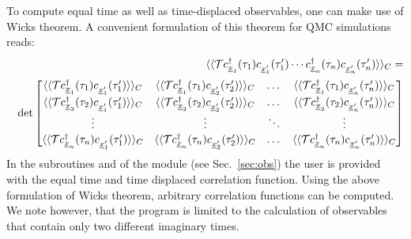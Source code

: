 To compute equal time as well as time-displaced observables,  one can make use of Wicks theorem. A convenient formulation of this theorem for  QMC simulations reads: 
\begin{eqnarray}
& & \langle \langle 	{\cal T}   c^{\dagger}_{\underline x_{1}}(\tau_{1}) c^{\phantom\dagger}_{{\underline x}'_{1}}(\tau'_{1})  
\cdots c^{\dagger}_{\underline x_{n}}(\tau_{n}) c^{\phantom\dagger}_{{\underline x}'_{n}}(\tau'_{n}) 
\rangle \rangle_{C} =
\nonumber \\ & & \det  
\begin{bmatrix}
   \langle \langle   {\cal T}   c^{\dagger}_{\underline x_{1}}(\tau_{1}) c^{\phantom\dagger}_{{\underline x}'_{1}}(\tau'_{1})  \rangle \rangle_{C} & 
    \langle \langle  {\cal T}   c^{\dagger}_{\underline x_{1}}(\tau_{1}) c^{\phantom\dagger}_{{\underline x}'_{2}}(\tau'_{2})  \rangle \rangle_{C}  & \dots   &   
    \langle \langle   {\cal T}   c^{\dagger}_{\underline x_{1}}(\tau_{1}) c^{\phantom\dagger}_{{\underline x}'_{n}}(\tau'_{n})  \rangle \rangle_{C}  \\
    \langle \langle   {\cal T}   c^{\dagger}_{\underline x_{2}}(\tau_{2}) c^{\phantom\dagger}_{{\underline x}'_{1}}(\tau'_{1})  \rangle \rangle_{C}  & 
      \langle \langle   {\cal T}   c^{\dagger}_{\underline x_{2}}(\tau_{2}) c^{\phantom\dagger}_{{\underline x}'_{2}}(\tau'_{2})  \rangle \rangle_{C}  & \dots  &
       \langle \langle   {\cal T}   c^{\dagger}_{\underline x_{2}}(\tau_{2}) c^{\phantom\dagger}_{{\underline x}'_{n}}(\tau'_{n})  \rangle \rangle_{C}   \\
    \vdots & \vdots &  \ddots & \vdots \\
    \langle \langle   {\cal T}   c^{\dagger}_{\underline x_{n}}(\tau_{n}) c^{\phantom\dagger}_{{\underline x}'_{1}}(\tau'_{1})  \rangle \rangle_{C}   & 
     \langle \langle   {\cal T}   c^{\dagger}_{\underline x_{n}}(\tau_{n}) c^{\phantom\dagger}_{{\underline x}'_{2}}(\tau'_{2})  \rangle \rangle_{C}   & \dots  & 
     \langle \langle   {\cal T}   c^{\dagger}_{\underline x_{n}}(\tau_{n}) c^{\phantom\dagger}_{{\underline x}'_{n}}(\tau'_{n})  \rangle \rangle_{C}
 \end{bmatrix}
\end{eqnarray}
In the subroutines     and  of  the module  (see Sec.~\ref{sec:obs})   the user is provided with the equal time and time displaced correlation function. Using the  above  formulation  of  Wicks theorem, arbitrary  correlation functions can be computed. We note however, that the program is limited to the calculation of observables that contain only two different imaginary times.  


